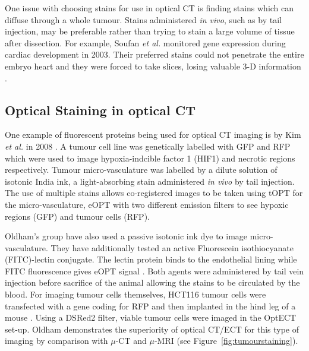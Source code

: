 	
	
	One issue with choosing stains for use in optical CT is finding stains which can diffuse through a whole tumour. Stains administered \textit{in vivo}, such as by tail injection, may be preferable rather than trying to stain a large volume of tissue after dissection. For example, Soufan \textit{et al.} monitored gene expression during cardiac development in 2003. Their preferred stains  could not penetrate the entire embryo heart and they were forced to take slices, losing valuable 3-D information \cite{Soufan:2003cd}. 
	
	
	\subsection{Optical Staining in optical CT}
	
	One example of fluorescent proteins being used for optical CT imaging is by Kim \textit{et al.} in 2008 \cite{Kim:2008eua}. A tumour cell line was genetically labelled with GFP and RFP which were used to image hypoxia-indcible factor 1 (HIF1) and necrotic regions respectively. Tumour micro-vasculature was labelled by a dilute solution of isotonic India ink, a light-absorbing stain administered \textit{in vivo} by tail injection. The use of multiple stains allows co-registered images to be taken using tOPT for the micro-vasculature, eOPT with two different emission filters to see hypoxic regions (GFP) and tumour cells (RFP). 
	
	
	
	
	
	
	
	Oldham's group have also used a passive isotonic ink dye to image micro-vasculature. They have additionally tested an active  Fluorescein isothiocyanate (FITC)-lectin conjugate. The lectin protein binds to the endothelial lining while FITC fluorescence gives eOPT signal \cite{Oldham:2007ku}. Both agents were administered by tail vein injection before sacrifice of the animal allowing the stains to be circulated by the blood.  For imaging tumour cells themselves, HCT116 tumour cells were transfected with a gene coding for RFP and then implanted in the hind leg of a mouse \cite{Oldham:2006}. Using a DSRed2 filter, viable tumour cells were imaged in the OptECT set-up. Oldham demonstrates the superiority of optical CT/ECT for this type of imaging by comparison with $\mu$-CT and $\mu$-MRI (see Figure~\ref{fig:tumourstaining}).
	
